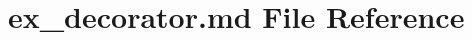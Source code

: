 \hypertarget{ex__decorator_8md}{}\section{ex\+\_\+decorator.\+md File Reference}
\label{ex__decorator_8md}
